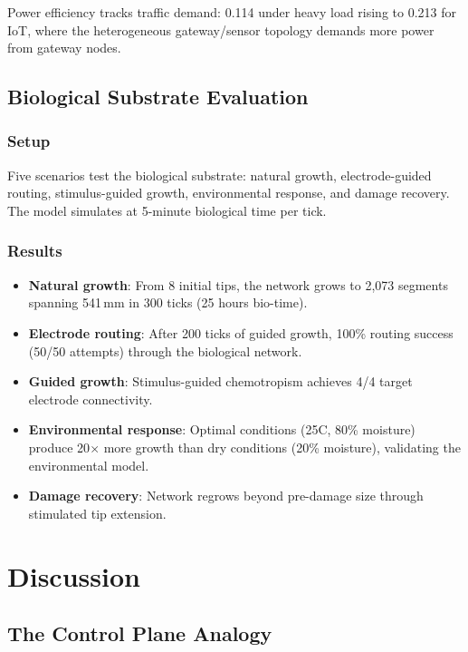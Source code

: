 \documentclass[conference,10pt]{IEEEtran}
\begin{document}
Power efficiency tracks traffic demand: 0.114 under heavy load rising to 0.213 for IoT, where the heterogeneous gateway/sensor topology demands more power from gateway nodes.

\subsection{Biological Substrate Evaluation}

\subsubsection{Setup}

Five scenarios test the biological substrate: natural growth, electrode-guided routing, stimulus-guided growth, environmental response, and damage recovery. The model simulates at 5-minute biological time per tick.

\subsubsection{Results}

\begin{itemize}
    \item \textbf{Natural growth}: From 8 initial tips, the network grows to 2,073 segments spanning 541\,mm in 300 ticks (25 hours bio-time).
    \item \textbf{Electrode routing}: After 200 ticks of guided growth, 100\% routing success (50/50 attempts) through the biological network.
    \item \textbf{Guided growth}: Stimulus-guided chemotropism achieves 4/4 target electrode connectivity.
    \item \textbf{Environmental response}: Optimal conditions (25\textdegree C, 80\% moisture) produce 20$\times$ more growth than dry conditions (20\% moisture), validating the environmental model.
    \item \textbf{Damage recovery}: Network regrows beyond pre-damage size through stimulated tip extension.
\end{itemize}

\section{Discussion}
\label{sec:discussion}

\subsection{The Control Plane Analogy}
\end{document}
